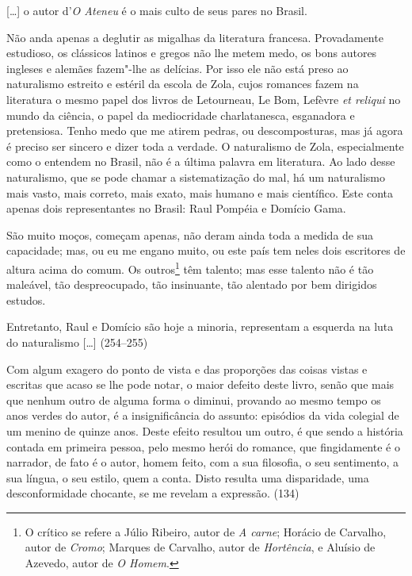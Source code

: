 
[\ldots] o autor d'\textit{O Ateneu} é o mais culto de seus pares no Brasil.

Não anda apenas a deglutir as migalhas da literatura
francesa. Provadamente estudioso, os clássicos latinos e gregos não lhe
metem medo, os bons autores ingleses e alemães fazem"-lhe as delícias.
Por isso ele não está preso ao naturalismo estreito e estéril da escola
de Zola, cujos romances fazem na literatura o mesmo papel dos livros de
Letourneau, Le Bom, Lefèvre \textit{et reliqui} no mundo da ciência, o papel da mediocridade
charlatanesca, esganadora e pretensiosa. Tenho medo que me atirem
pedras, ou descomposturas, mas já agora é preciso ser sincero e dizer
toda a verdade. O naturalismo de Zola, especialmente como o entendem no
Brasil, não é a última palavra em literatura. Ao lado desse
naturalismo, que se pode chamar a sistematização do mal, há um
naturalismo mais vasto, mais correto, mais exato, mais humano e mais
científico. Este conta apenas dois representantes no Brasil: Raul
Pompéia e Domício Gama.

São muito moços, começam apenas, não deram ainda toda a
medida de sua capacidade; mas, ou eu me engano muito, ou este país tem
neles dois escritores de altura acima do comum. Os outros\footnote{O
crítico se refere a Júlio Ribeiro, autor de \textit{A carne}; Horácio
de Carvalho, autor de \textit{Cromo}; Marques de Carvalho, autor de
\textit{Hortência}, e Aluísio de Azevedo, autor de \textit{O Homem}.} 
têm talento; mas esse talento não é tão maleável, tão
despreocupado, tão insinuante, tão alentado por bem dirigidos estudos.

Entretanto, Raul e Domício são hoje a minoria, representam a esquerda na
luta do naturalismo [\ldots] (254--255)



Com algum exagero do ponto de vista e das proporções das coisas vistas e
escritas que acaso se lhe pode notar, o maior defeito deste livro,
senão que mais que nenhum outro de alguma forma o diminui, provando ao
mesmo tempo os anos verdes do autor, é a insignificância do assunto:
episódios da vida colegial de um menino de quinze anos. Deste efeito
resultou um outro, é que sendo a história contada em primeira pessoa,
pelo mesmo herói do romance, que fingidamente é o narrador, de fato é o
autor, homem feito, com a sua filosofia, o seu sentimento, a sua
língua, o seu estilo, quem a conta. Disto resulta uma disparidade, uma
desconformidade chocante, se me revelam a expressão. (134)

